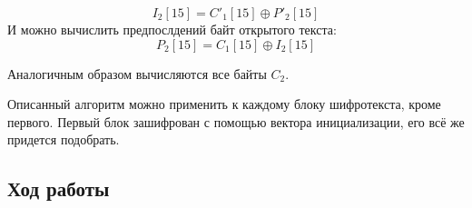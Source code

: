\documentclass[a4paper, 14pt]{extarticle}
\begin{document}
\begin{equation*}
    I_2[15] = C'_1[15] \oplus P'_2[15]
\end{equation*}
И можно вычислить предпослдений байт открытого текста:
\begin{equation*}
    P_2[15] = C_1[15] \oplus I_2[15]
\end{equation*}

Аналогичным образом вычисляются все байты $C_2$.

Описанный алгоритм можно применить к каждому блоку шифротекста, кроме первого. Первый блок зашифрован с помощью вектора инициализации, его всё же придется подобрать.

\subsection{Ход работы}
\end{document}
